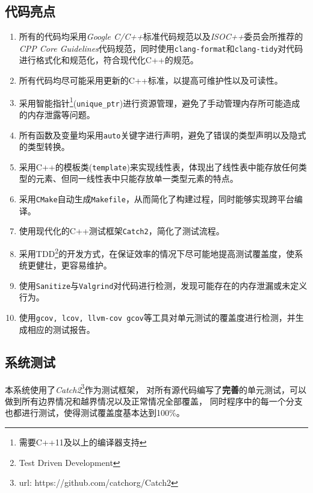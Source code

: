\subsection{代码亮点}
\begin{enumerate}
        \item 所有的代码均采用\emph{Google
            C/C++}标准代码规范以及\emph{ISOC++}委员会所推荐的\emph{CPP Core Guidelines}代码规范，同时使用\texttt{clang-format}和\texttt{clang-tidy}对代码进行格式化和规范化，符合现代化C++的规范。
        \item 所有代码均尽可能采用更新的C++标准，以提高可维护性以及可读性。
        \item 采用智能指针\footnote{需要C++11及以上的编译器支持}(\texttt{unique\_ptr})进行资源管理，避免了手动管理内存所可能造成的内存泄露等问题。
        \item 所有函数及变量均采用\texttt{auto}关键字进行声明，避免了错误的类型声明以及隐式的类型转换。
        \item 采用C++的模板类(\texttt{template})来实现线性表，体现出了线性表中能存放任何类型的元素、但同一线性表中只能存放单一类型元素的特点。
        \item 采用\texttt{CMake}自动生成\texttt{Makefile}，从而简化了构建过程，同时能够实现跨平台编译。
        \item 使用现代化的C++测试框架\texttt{Catch2}，简化了测试流程。
        \item 采用TDD\footnote{Test Driven Development}的开发方式，在保证效率的情况下尽可能地提高测试覆盖度，使系统更健壮，更容易维护。
        \item 使用\texttt{Sanitize}与\texttt{Valgrind}对代码进行检测，发现可能存在的内存泄漏或未定义行为。
        \item 使用\texttt{gcov, lcov, llvm-cov gcov}等工具对单元测试的覆盖度进行检测，并生成相应的测试报告。
\end{enumerate}

\subsection{系统测试}
本系统使用了\textit{Catch2}\footnote{url: https://github.com/catchorg/Catch2}作为测试框架，
对所有源代码编写了\textbf{完善}的单元测试，可以做到所有边界情况和越界情况以及正常情况全部覆盖，
同时程序中的每一个分支也都进行测试，使得测试覆盖度基本达到100\%。
